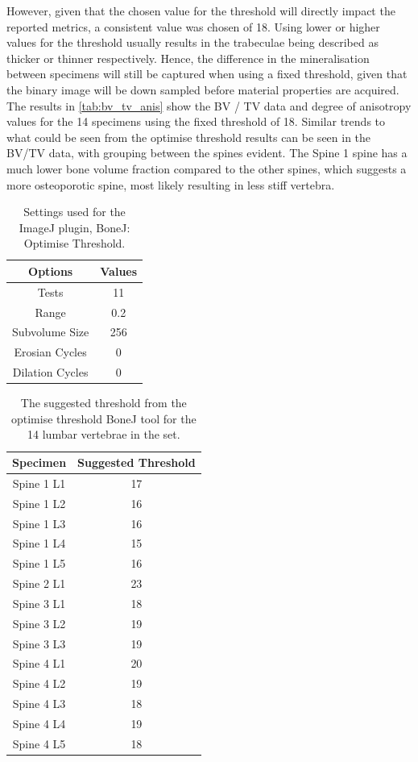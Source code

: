 However, given that the chosen value for the threshold will directly impact the reported metrics, a consistent value was chosen of 18. Using lower or higher values for the threshold usually results in the trabeculae being described as thicker or thinner respectively.
Hence, the difference in the mineralisation between specimens will still be captured when using a fixed threshold, given that the binary image will be down sampled before material properties are acquired.
The results in \cref{tab:bv_tv_anis} show the BV / TV data and degree of anisotropy values for the 14 specimens using the fixed threshold of 18.
Similar trends to what could be seen from the optimise threshold results can be seen in the BV/TV data, with grouping between the
spines evident.
The Spine 1 spine has a much lower bone volume fraction compared to the other spines, which suggests a more osteoporotic spine, most likely resulting in less stiff vertebra.

\begin{table}[ht!]
	\caption{Settings used for the ImageJ plugin, BoneJ: Optimise Threshold.}
	\label{tab:bonej}
	\centering
	\begin{tabular}{c|c}
    Options & Values \\
    \hline
    \hline
    Tests & 11  \\
    Range & 0.2 \\
    Subvolume Size & 256 \\
    Erosian Cycles & 0 \\
    Dilation Cycles & 0 \\
    \hline
	\end{tabular}
\end{table}

\begin{table}[ht!]
	\caption{The suggested threshold from the optimise threshold BoneJ tool for the 14 lumbar vertebrae in the set.}
	\label{tab:optTH}
	\centering
	\begin{tabular}{c|c}
    Specimen    & Suggested Threshold   \\ \hline \hline
    Spine 1 L1 & 17 \\
    Spine 1 L2 & 16\\
    Spine 1 L3 & 16\\
    Spine 1 L4 & 15\\
    Spine 1 L5 & 16\\
    Spine 2 L1 & 23\\
    Spine 3 L1 & 18\\
    Spine 3 L2 & 19\\
    Spine 3 L3 & 19\\
    Spine 4 L1 & 20\\
    Spine 4 L2 & 19\\
    Spine 4 L3 & 18\\
    Spine 4 L4 & 19\\
    Spine 4 L5 & 18\\
    \hline
	\end{tabular}
\end{table}



